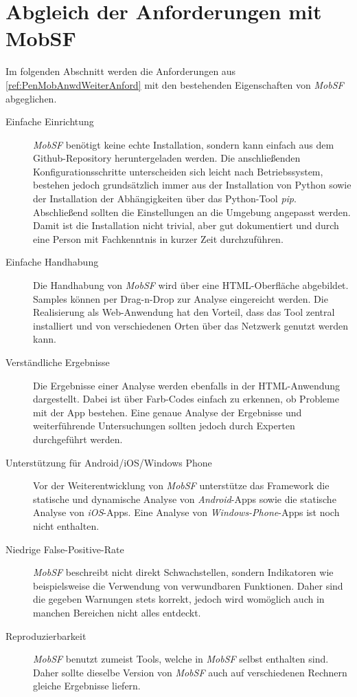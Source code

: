 

\newpage
\section{Abgleich der Anforderungen mit MobSF}\label{ref:PenMobAnwAbgAndMobSF}

Im folgenden Abschnitt werden die Anforderungen aus \ref{ref:PenMobAnwdWeiterAnford} mit den bestehenden Eigenschaften von \textit{MobSF} abgeglichen.

\begin{description}
	\item[Einfache Einrichtung] \textit{MobSF} benötigt keine echte Installation, sondern kann einfach aus dem Github-Repository heruntergeladen werden. Die anschließenden Konfigurationsschritte unterscheiden sich leicht nach Betriebssystem, bestehen jedoch grundsätzlich immer aus der Installation von Python sowie der Installation der Abhängigkeiten über das Python-Tool \textit{pip}. Abschließend sollten die Einstellungen an die Umgebung angepasst werden. Damit ist die Installation nicht trivial, aber gut dokumentiert und durch eine Person mit Fachkenntnis in kurzer Zeit durchzuführen.
	
	\item[Einfache Handhabung] Die Handhabung von \textit{MobSF} wird über eine HTML-Oberfläche abgebildet. Samples können per Drag-n-Drop zur Analyse eingereicht werden. Die Realisierung als Web-Anwendung hat den Vorteil, dass das Tool zentral installiert und von verschiedenen Orten über das Netzwerk genutzt werden kann.
	
	\item[Verständliche Ergebnisse] Die Ergebnisse einer Analyse werden ebenfalls in der HTML-Anwendung dargestellt. Dabei ist über Farb-Codes einfach zu erkennen, ob Probleme mit der App bestehen. Eine genaue Analyse der Ergebnisse und weiterführende Untersuchungen sollten jedoch durch Experten durchgeführt werden.
	
	\item[Unterstützung für Android/iOS/Windows Phone] Vor der Weiterentwicklung von \textit{MobSF} unterstütze das Framework die statische und dynamische Analyse von \textit{Android}-Apps sowie die statische Analyse von \textit{iOS}-Apps. Eine Analyse von \textit{Windows-Phone}-Apps ist noch nicht enthalten.
	
	\item[Niedrige False-Positive-Rate] \textit{MobSF} beschreibt nicht direkt Schwachstellen, sondern Indikatoren wie beispielsweise die Verwendung von verwundbaren Funktionen. Daher sind die gegeben Warnungen stets korrekt, jedoch wird womöglich auch in manchen Bereichen nicht alles entdeckt.
	
	\item[Reproduzierbarkeit] \textit{MobSF} benutzt zumeist Tools, welche in \textit{MobSF} selbst enthalten sind. Daher sollte dieselbe Version von \textit{MobSF} auch auf verschiedenen Rechnern gleiche Ergebnisse liefern.
	
\end{description}

